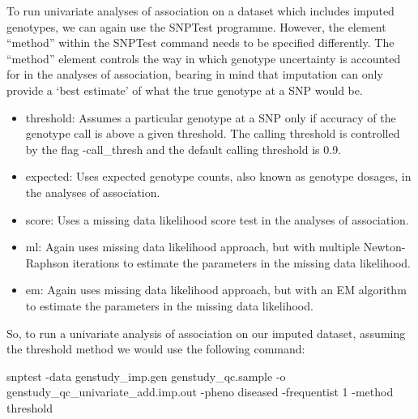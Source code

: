 \documentclass[]{book}
\newenvironment{Shaded}{\begin{snugshade}}{\end{snugshade}}
\newcommand{\ExtensionTok}[1]{#1}
\newcommand{\NormalTok}[1]{#1}
\providecommand{\tightlist}{%
  \setlength{\itemsep}{0pt}\setlength{\parskip}{0pt}}
\begin{document}
To run univariate analyses of association on a dataset which includes
imputed genotypes, we can again use the SNPTest programme. However, the
element ``method'' within the SNPTest command needs to be specified
differently. The ``method'' element controls the way in which genotype
uncertainty is accounted for in the analyses of association, bearing in
mind that imputation can only provide a `best estimate' of what the true
genotype at a SNP would be.

\begin{itemize}
\tightlist
\item
  threshold: Assumes a particular genotype at a SNP only if accuracy of
  the genotype call is above a given threshold. The calling threshold is
  controlled by the flag -call\_thresh and the default calling threshold
  is 0.9.
\item
  expected: Uses expected genotype counts, also known as genotype
  dosages, in the analyses of association.
\item
  score: Uses a missing data likelihood score test in the analyses of
  association.
\item
  ml: Again uses missing data likelihood approach, but with multiple
  Newton-Raphson iterations to estimate the parameters in the missing
  data likelihood.
\item
  em: Again uses missing data likelihood approach, but with an EM
  algorithm to estimate the parameters in the missing data likelihood.
\end{itemize}

So, to run a univariate analysis of association on our imputed dataset,
assuming the threshold method we would use the following command:

\begin{Shaded}
\begin{Highlighting}[]
\ExtensionTok{snptest}\NormalTok{ -data genstudy_imp.gen genstudy_qc.sample -o genstudy_qc_univariate_add.imp.out -pheno diseased -frequentist 1 -method threshold}
\end{Highlighting}
\end{Shaded}
\end{document}
